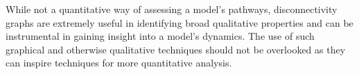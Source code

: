 While not a quantitative way of assessing a model's pathways, disconnectivity graphs are extremely useful in identifying broad qualitative properties and can be instrumental in gaining insight into a model's dynamics. The use of such graphical and otherwise qualitative techniques should not be overlooked as they can inspire techniques for more quantitative analysis.  

%
%
%
%
